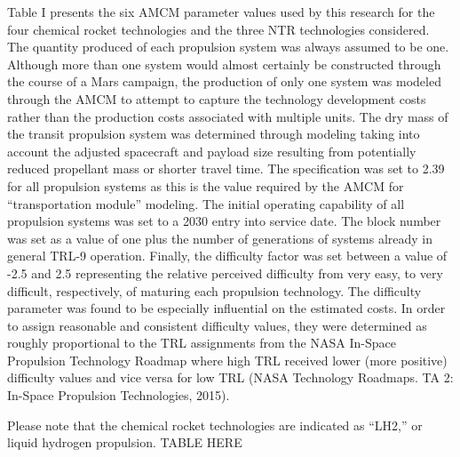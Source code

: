 \documentclass[]{aiaa-pretty}
\begin{document}
Table I presents the six AMCM parameter values used by this research for the four chemical rocket technologies and the three NTR technologies considered. The quantity produced of each propulsion system was always assumed to be one. Although more than one system would almost certainly be constructed through the course of a Mars campaign, the production of only one system was modeled through the AMCM to attempt to capture the technology development costs rather than the production costs associated with multiple units. The dry mass of the transit propulsion system was determined through modeling taking into account the adjusted spacecraft and payload size resulting from potentially reduced propellant mass or shorter travel time. The specification was set to 2.39 for all propulsion systems as this is the value required by the AMCM for “transportation module” modeling. The initial operating capability of all propulsion systems was set to a 2030 entry into service date. The block number was set as a value of one plus the number of generations of systems already in general TRL-9 operation. Finally, the difficulty factor was set between a value of -2.5 and 2.5 representing the relative perceived difficulty from very easy, to very difficult, respectively, of maturing each propulsion technology. The difficulty parameter was found to be especially influential on the estimated costs. In order to assign reasonable and consistent difficulty values, they were determined as roughly proportional to the TRL assignments from the NASA In-Space Propulsion Technology Roadmap where high TRL received lower (more positive) difficulty values and vice versa for low TRL (NASA Technology Roadmaps. TA 2: In-Space Propulsion Technologies, 2015).

Please note that the chemical rocket technologies are indicated as “LH2,” or liquid hydrogen propulsion.
TABLE HERE
\end{document}
